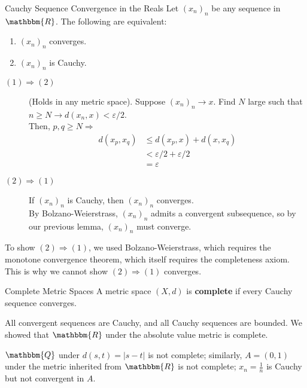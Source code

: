 \documentclass[10pt]{extarticle}
\newcommand{\Q}{\mathbbm{Q}}
\newcommand{\R}{\mathbbm{R}}
\begin{document}
  \begin{problem}{Cauchy Sequence Convergence in the Reals}
    Let $(x_n)_n$ be any sequence in $\R$. The following are equivalent:
    \begin{enumerate}[(1)]
      \item $(x_n)_n$ converges.
      \item $(x_n)_n$ is Cauchy.
    \end{enumerate}
    \tcblower
    \begin{description}
      \item[$(1) \Rightarrow (2)$] (Holds in any metric space). Suppose $(x_n)_n \rightarrow x$. Find $N$ large such that $n\geq N \rightarrow d(x_n,x) < \varepsilon/2$.\\

        Then, $p,q\geq N \Rightarrow$
        \begin{align*}
          d(x_p,x_q) &\leq d(x_p,x) + d(x,x_q)\\
                     &< \varepsilon/2 + \varepsilon/2\\
                     &= \varepsilon
        \end{align*}
      \item[$(2)\Rightarrow(1)$] If $(x_n)_n$ is Cauchy, then $(x_n)_n$ converges.\\

        By Bolzano-Weierstrass, $(x_n)_n$ admits a convergent subsequence, so by our previous lemma, $(x_n)_n$ must converge.
    \end{description}
    \begin{description}
      \small
      \item[Note:] To show $(2) \Rightarrow (1)$, we used Bolzano-Weierstrass, which requires the monotone convergence theorem, which itself requires the completeness axiom. This is why we cannot show $(2) \Rightarrow (1)$ converges.
    \end{description}
  \end{problem}
  \begin{problem}{Complete Metric Spaces}
    A metric space $(X,d)$ is \textbf{complete} if every Cauchy sequence converges.
    \begin{description}
      \small
      \item[Remark:] All convergent sequences are Cauchy, and all Cauchy sequences are bounded. We showed that $\R$ under the absolute value metric is complete.
    \end{description}
    $\Q$ under $d(s,t) = |s-t|$ is not complete; similarly, $A = (0,1)$ under the metric inherited from $\R$ is not complete; $x_n = \frac{1}{n}$ is Cauchy but not convergent in $A$.
  \end{problem}
\end{document}
